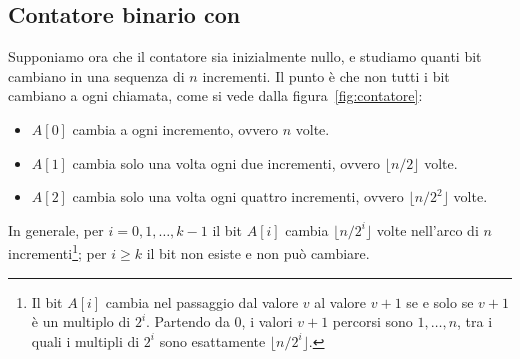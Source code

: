 \subsection{Contatore binario con \Increment}\label{sec:contatore-aggr}
Supponiamo ora che il contatore sia inizialmente nullo, e studiamo quanti bit cambiano in una sequenza di $n$ incrementi. Il punto è che non tutti i bit cambiano a ogni chiamata, come si vede dalla figura~\ref{fig:contatore}:
\begin{itemize}
    \item $A[0]$ cambia a ogni incremento, ovvero $n$ volte.
    \item $A[1]$ cambia solo una volta ogni due incrementi, ovvero $\lfloor n/2\rfloor$ volte.
    \item $A[2]$ cambia solo una volta ogni quattro incrementi, ovvero $\lfloor n/2^2\rfloor$ volte.
\end{itemize}
In generale, per $i = 0,1,\dots,k-1$ il bit $A[i]$ cambia $\lfloor n/2^i \rfloor$ volte nell'arco di $n$ incrementi\footnote{Il bit $A[i]$ cambia nel passaggio dal valore $v$ al valore $v+1$ se e solo se $v+1$ è un multiplo di $2^i$. Partendo da $0$, i valori $v+1$ percorsi sono $1,\dots,n$, tra i quali i multipli di $2^i$ sono esattamente $\lfloor n/2^i\rfloor$.}; per $i \ge k$ il bit non esiste e non può cambiare.

